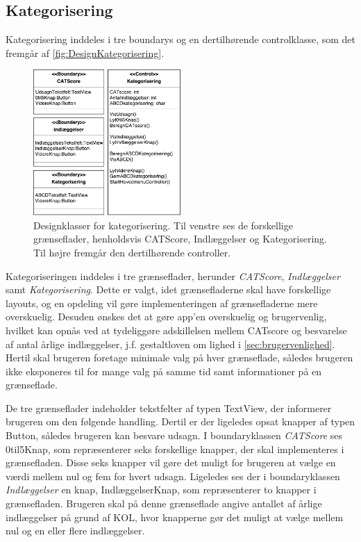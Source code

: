 \subsection*{Kategorisering}
Kategorisering inddeles i tre boundarys og en dertilhørende controlklasse, som det fremgår af \autoref{fig:DesignKategorisering}.

\begin{figure} [H]
\centering
\includegraphics[width=0.5\textwidth]{figures/MVC/MVCKategorisering}
\caption{Designklasser for kategorisering. Til venstre ses de forskellige grænseflader, henholdsvis CATScore, Indlæggelser og Kategorisering. Til højre fremgår den dertilhørende controller.}
\label{fig:DesignKategorisering}
\end{figure}

\noindent
Kategoriseringen inddeles i tre grænseflader, herunder \textit{CATScore}, \textit{Indlæggelser} samt \textit{Kategorisering}. Dette er valgt, idet grænsefladerne skal have forskellige layouts, og en opdeling vil gøre implementeringen af grænsefladerne mere overskuelig. Desuden ønskes det at gøre app’en overskuelig og
brugervenlig, hvilket kan opnås ved at tydeliggøre adskillelsen mellem CATscore og besvarelse af antal årlige indlæggelser, j.f. gestaltloven om lighed i \autoref{sec:brugervenlighed}. Hertil skal brugeren foretage minimale valg på hver grænseflade, således
brugeren ikke eksponeres til for mange valg på samme tid samt informationer på en grænseflade.

De tre grænseflader indeholder tekstfelter af typen TextView, der informerer brugeren om den følgende handling. Dertil er der ligeledes opsat knapper af typen Button, således brugeren kan besvare udsagn. I boundaryklassen \textit{CATScore} ses 0til5Knap, som repræsenterer seks forskellige knapper, der skal implementeres i grænsefladen. Disse seks knapper vil gøre det muligt for brugeren at vælge en værdi mellem nul og fem for hvert udsagn. Ligeledes ses der i boundaryklassen \textit{Indlæggelser} en knap, IndlæggelserKnap, som repræsenterer to knapper i grænsefladen. Brugeren skal på denne grænseflade angive antallet af årlige indlæggelser på grund af KOL, hvor knapperne gør det muligt at vælge mellem nul og en eller flere indlæggelser.

